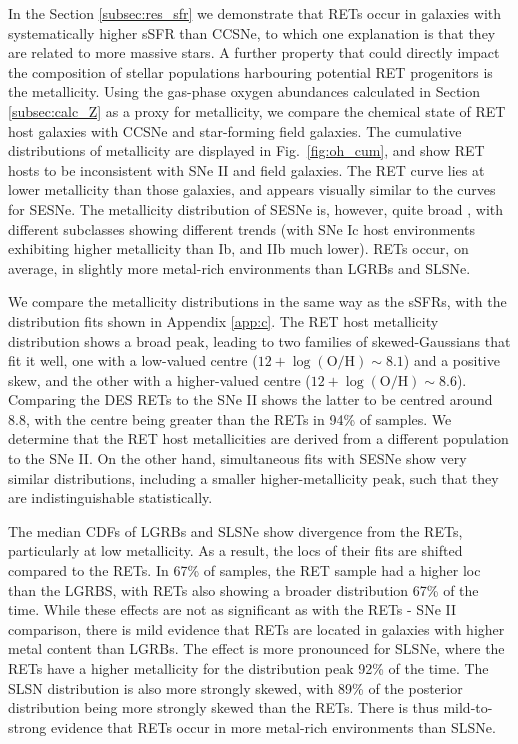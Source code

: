 \documentclass[fleqn,usenatbib,]{mnras}
\begin{document}
In the Section \ref{subsec:res_sfr} we demonstrate that RETs occur in galaxies with systematically higher sSFR than CCSNe, to which one explanation is that they are related to more massive stars. A further property that could directly impact the composition of stellar populations harbouring potential RET progenitors is the metallicity. Using the gas-phase oxygen abundances calculated in Section \ref{subsec:calc_Z} as a proxy for metallicity, we compare the chemical state of RET host galaxies with CCSNe and star-forming field galaxies. The cumulative distributions of metallicity are displayed in Fig.~\ref{fig:oh_cum}, and show RET hosts to be inconsistent with SNe II and field galaxies. The RET curve lies at lower metallicity than those galaxies, and appears visually similar to the curves for SESNe. The metallicity distribution of SESNe is, however, quite broad \citep[e.g.][]{Anderson2010}, with different subclasses showing different trends (with SNe Ic host environments exhibiting higher metallicity than Ib, and IIb much lower). RETs occur, on average, in slightly more metal-rich environments than LGRBs and SLSNe.

We compare the metallicity distributions in the same way as the sSFRs, with the distribution fits shown in Appendix \ref{app:c}. The RET host metallicity distribution shows a broad peak, leading to two families of skewed-Gaussians that fit it well, one with a low-valued centre  ($12 + \log \mathrm{(O/H)} \sim 8.1$) and a positive skew, and the other with a higher-valued centre ($12 + \log \mathrm{(O/H)} \sim 8.6$). Comparing the DES RETs to the \citet{Stoll2013} SNe II shows the latter to be centred around 8.8, with the centre being greater than the RETs in 94\% of samples. We determine that the RET host metallicities are derived from a different population to the SNe II. On the other hand, simultaneous fits with SESNe show very similar distributions, including a smaller higher-metallicity peak, such that they are indistinguishable statistically. 

The median CDFs of LGRBs and SLSNe show divergence from the RETs, particularly at low metallicity. As a result, the locs of their fits are shifted compared to the RETs. In 67\% of samples, the RET sample had a higher loc than the LGRBS, with RETs also showing a broader distribution 67\% of the time. While these effects are not as significant as with the RETs - SNe II comparison, there is mild evidence that RETs are located in galaxies with higher metal content than LGRBs. The effect is more pronounced for SLSNe, where the RETs have a higher metallicity for the distribution peak 92\% of the time. The SLSN distribution is also more strongly skewed, with 89\% of the posterior distribution being more strongly skewed than the RETs. There is thus mild-to-strong evidence that RETs occur in more metal-rich environments than SLSNe. 
\end{document}
